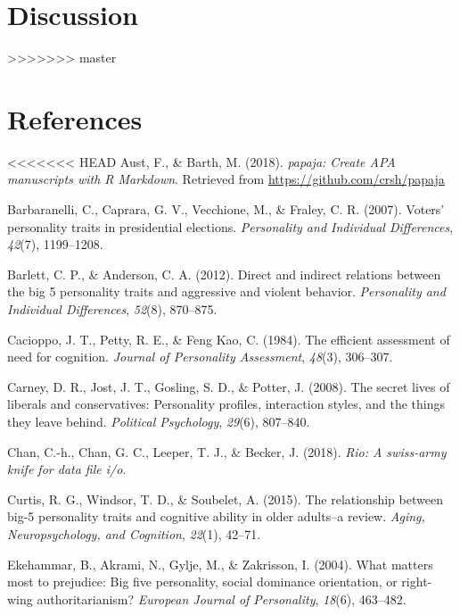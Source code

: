 \documentclass[man]{apa6}
\begin{document}
\hypertarget{discussion}{%
\section{Discussion}\label{discussion}}
>>>>>>> master

\newpage

\hypertarget{references}{%
\section{References}\label{references}}

\begingroup
\setlength{\parindent}{-0.5in}
\setlength{\leftskip}{0.5in}

\hypertarget{refs}{}
<<<<<<< HEAD
\hypertarget{ref-R-papaja}{}
Aust, F., \& Barth, M. (2018). \emph{papaja: Create APA manuscripts with
R Markdown}. Retrieved from \url{https://github.com/crsh/papaja}

\hypertarget{ref-barbaranelli2007voters}{}
Barbaranelli, C., Caprara, G. V., Vecchione, M., \& Fraley, C. R.
(2007). Voters' personality traits in presidential elections.
\emph{Personality and Individual Differences}, \emph{42}(7), 1199--1208.

\hypertarget{ref-barlett2012direct}{}
Barlett, C. P., \& Anderson, C. A. (2012). Direct and indirect relations
between the big 5 personality traits and aggressive and violent
behavior. \emph{Personality and Individual Differences}, \emph{52}(8),
870--875.

\hypertarget{ref-cacioppo1984efficient}{}
Cacioppo, J. T., Petty, R. E., \& Feng Kao, C. (1984). The efficient
assessment of need for cognition. \emph{Journal of Personality
Assessment}, \emph{48}(3), 306--307.

\hypertarget{ref-carney2008secret}{}
Carney, D. R., Jost, J. T., Gosling, S. D., \& Potter, J. (2008). The
secret lives of liberals and conservatives: Personality profiles,
interaction styles, and the things they leave behind. \emph{Political
Psychology}, \emph{29}(6), 807--840.

\hypertarget{ref-R-rio}{}
Chan, C.-h., Chan, G. C., Leeper, T. J., \& Becker, J. (2018).
\emph{Rio: A swiss-army knife for data file i/o}.

\hypertarget{ref-curtis2015relationship}{}
Curtis, R. G., Windsor, T. D., \& Soubelet, A. (2015). The relationship
between big-5 personality traits and cognitive ability in older
adults--a review. \emph{Aging, Neuropsychology, and Cognition},
\emph{22}(1), 42--71.

\hypertarget{ref-ekehammar2004matters}{}
Ekehammar, B., Akrami, N., Gylje, M., \& Zakrisson, I. (2004). What
matters most to prejudice: Big five personality, social dominance
orientation, or right-wing authoritarianism? \emph{European Journal of
Personality}, \emph{18}(6), 463--482.
\end{document}
